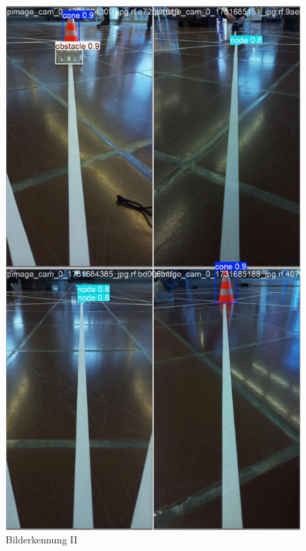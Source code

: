 \begin{figure}[H]
\begin{minipage}[b]{0.28\textwidth}
    \includegraphics[width=\textwidth]{assets/IT/yolo/val_batch1_pred.jpg}
    \caption{Bilderkennung II}
    \label{fig:yolo-ii}
  \end{minipage}
    \hfill
  \begin{minipage}[b]{0.28\textwidth}
    \centering

\end{minipage}
\end{figure}
